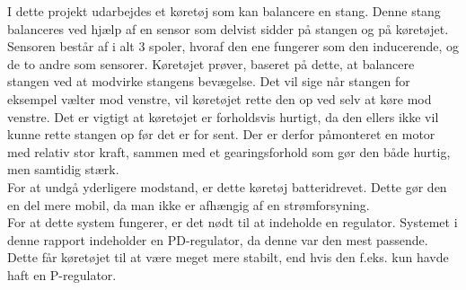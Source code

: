 I dette projekt udarbejdes et køretøj som kan balancere en stang. Denne stang balanceres ved hjælp af en sensor som delvist sidder på stangen og på køretøjet. Sensoren består af i alt 3 spoler, hvoraf den ene fungerer som den inducerende, og de to andre som sensorer. Køretøjet prøver, baseret på dette, at balancere stangen ved at modvirke stangens bevægelse. Det vil sige når stangen for eksempel vælter mod venstre, vil køretøjet rette den op ved selv at køre mod venstre. Det er vigtigt at køretøjet er forholdsvis hurtigt, da den ellers ikke vil kunne rette stangen op før det er for sent. Der er derfor påmonteret en motor med relativ stor kraft, sammen med et gearingsforhold som gør den både hurtig, men samtidig stærk. \\

For at undgå yderligere modstand, er dette køretøj batteridrevet. Dette gør den en del mere mobil, da man ikke er afhængig af en strømforsyning. \\

For at dette system fungerer, er det nødt til at indeholde en regulator. Systemet i denne rapport indeholder en PD-regulator, da denne var den mest passende. Dette får køretøjet til at være meget mere stabilt, end hvis den f.eks. kun havde haft en P-regulator. \\